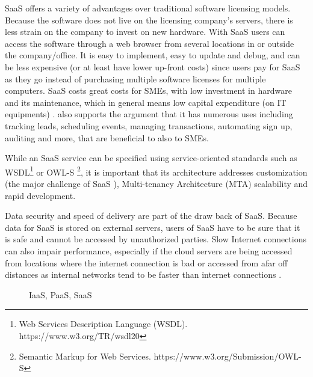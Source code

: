 SaaS offers a variety of advantages over traditional software licensing models. Because the software does not live on the licensing company’s servers, there is less strain on the company to invest on new hardware. With SaaS users can access the software through a web browser from several locations in or outside the company/office. It is easy to implement, easy to update and debug, and can be less expensive (or at least have lower up-front costs) since users pay for SaaS as they go instead of purchasing multiple software licenses for multiple computers. SaaS costs great costs for SMEs, with low investment in hardware and its maintenance, which in general means low capital expenditure (on IT equipments) \cite{haselmann2011software}. \cite{haselmann2011software} also supports the argument that it has numerous uses including tracking leads, scheduling events, managing transactions, automating sign up, auditing and more, that are beneficial to also to SMEs.

While an SaaS service can be specified using service-oriented standards such as WSDL\footnote{Web Services Description Language (WSDL). https://www.w3.org/TR/wsdl20} or OWL-S \footnote{Semantic Markup for Web Services. https://www.w3.org/Submission/OWL-S}, it is important that its architecture addresses customization (the major challenge of SaaS \cite{sun2007software}), Multi-tenancy Architecture (MTA) scalability and rapid development.

Data security and speed of delivery are part of the draw back of SaaS. Because data for SaaS is stored on external servers, users of SaaS have to be sure that it is safe and cannot be accessed by unauthorized parties. Slow Internet connections can also impair performance, especially if the cloud servers are being accessed from locations where the internet connection is bad or accessed from afar off distances as internal networks tend to be faster than internet connections \cite{tsai2014software}.

\begin{figure}[h]
\centering
{}
  \caption{IaaS, PaaS, SaaS}
  \label{fig: cloud_services}
\end{figure}

